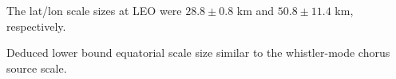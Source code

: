 \documentclass[draft, linenumbers]{agujournal}
\begin{document}






\begin{keypoints}
\item The  lat/lon scale sizes  at LEO were $28.8 \pm 0.8$ km and $50.8 \pm 11.4$ km, respectively.
\item Deduced lower bound equatorial scale size  similar to the whistler-mode chorus source scale.
\end{keypoints}

%
%

\end{document}
